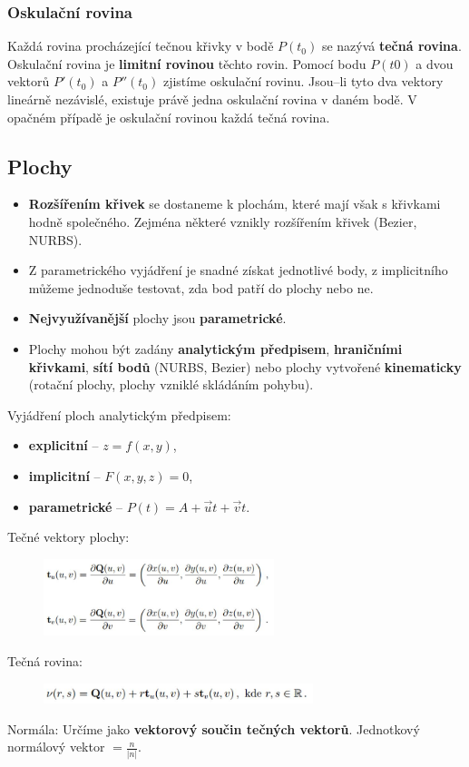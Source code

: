 \subsubsection{Oskulační rovina}
Každá rovina procházející tečnou křivky v bodě $P(t_0)$ se nazývá \textbf{tečná rovina}. Oskulační rovina je \textbf{limitní rovinou} těchto rovin. Pomocí bodu $P(t0)$ a dvou vektorů $P'(t_0)$ a $ P''(t_0)$ zjistíme oskulační rovinu. Jsou--li tyto dva vektory lineárně nezávislé, existuje právě jedna oskulační rovina v daném bodě. V opačném případě je oskulační rovinou každá tečná rovina.


\subsection{Plochy}
\begin{itemize}
	\item \textbf{Rozšířením křivek} se dostaneme k plochám, které mají však s křivkami hodně společného. Zejména některé vznikly rozšířením křivek (Bezier, NURBS).
\end{itemize}
\begin{itemize}
	\item Z parametrického vyjádření je snadné získat jednotlivé body, z implicitního můžeme jednoduše testovat, zda bod patří do plochy nebo ne. 
	\item \textbf{Nejvyužívanější} plochy jsou \textbf{parametrické}. 
	\item Plochy mohou být zadány \textbf{analytickým předpisem}, \textbf{hraničními křivkami}, \textbf{sítí bodů} (NURBS, Bezier) nebo plochy vytvořené \textbf{kinematicky} (rotační plochy, plochy vzniklé skládáním pohybu).
\end{itemize}
Vyjádření ploch analytickým předpisem:
\begin{itemize}
	\item \textbf{explicitní} -- $z = f(x, y)$,
	\item \textbf{implicitní} -- $F(x, y, z) = 0$,
	\item \textbf{parametrické} -- $	P (t) = A + \vec{u}t + \vec{v}t$.
\end{itemize}
Tečné vektory plochy:
\begin{figure}[H]
\centering
\includegraphics[width=0.6\textwidth]{assets/3_tecne_vektory_plochy}
\end{figure}
Tečná rovina:
\begin{figure}[H]
\centering
\includegraphics[width=0.7\textwidth]{assets/3_tecna_rovina}
\end{figure}
Normála: Určíme jako \textbf{vektorový součin tečných vektorů}. Jednotkový normálový vektor  $= 
\frac{n}{|n|}$.

